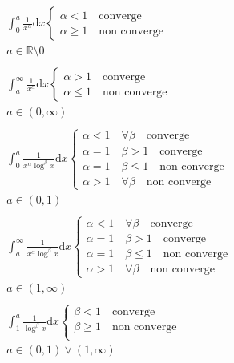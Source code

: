 \documentclass[a4paper]{article}
\theoremstyle{plain}
\begin{document}
\begin{equation*}
\begin{gathered}
    \int_0^a{\frac{1}{x^\alpha}\text{d}x}
    \begin{cases}
        \alpha<1   \quad \text{converge}\\
        \alpha\ge1 \quad \text{non converge}
    \end{cases}
    \\
    a \in \mathbb{R} \setminus {0}
    \\
    \\
    \int_a^\infty{\frac{1}{x^\alpha}\text{d}x}
    \begin{cases}
        \alpha>1   \quad \text{converge}\\
        \alpha\le1 \quad \text{non converge}
    \end{cases}
    \\
    a \in (0, \infty)
    \\
    \\
    \int_0^a{\frac{1}{x^\alpha\log^{\beta} x}\text{d}x}
    \begin{cases}
        \alpha<1 \quad \forall\beta\quad \text{converge}\\
        \alpha=1 \quad \beta>1     \quad \text{converge}\\
        \alpha=1 \quad \beta\le1   \quad \text{non converge}\\
        \alpha>1 \quad \forall\beta\quad \text{non converge}
    \end{cases}
    \\
    a \in (0,1)
    \\
    \\
    \int_a^\infty{\frac{1}{x^\alpha\log^{\beta} x}\text{d}x}
    \begin{cases}
        \alpha<1 \quad \forall\beta\quad \text{converge}\\
        \alpha=1 \quad \beta>1     \quad \text{converge}\\
        \alpha=1 \quad \beta\le1   \quad \text{non converge}\\
        \alpha>1 \quad \forall\beta\quad \text{non converge}
    \end{cases}
    \\
    a \in (1, \infty)
    \\
    \\
    \int_1^a{\frac{1}{\log^{\beta} x}\text{d}x}
    \begin{cases}
        \beta<1   \quad \text{converge}\\
        \beta\ge1 \quad \text{non converge}\\
        \end{cases}
    \\
    a \in (0,1) \vee (1, \infty)
    \\
\end{gathered}
\end{equation*}
\end{document}
